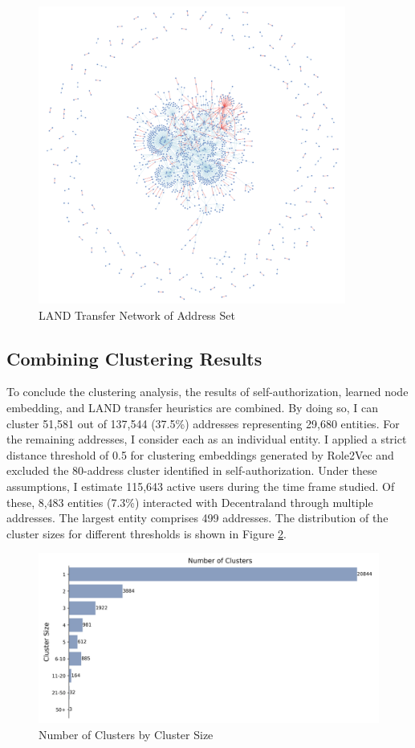\documentclass[12pt,a4paper,titlepage,oneside,english]{article}
\begin{document}
\begin{figure}[h!]
	\centering
	\includegraphics[width=0.9\textwidth]{./figures/land_network.png}
	\caption{LAND Transfer Network of Address Set}
	\label{fig:LAND_network}
\end{figure} 

\subsection{Combining Clustering Results}
To conclude the clustering analysis, the results of self-authorization, learned node embedding, and LAND transfer heuristics are combined. By doing so, I can cluster 51,581 out of 137,544 (37.5\%) addresses representing 29,680 entities. 
For the remaining addresses, I consider each as an individual entity. 
I applied a strict distance threshold of 0.5 for clustering embeddings generated by Role2Vec and excluded the 80-address cluster identified in self-authorization.
Under these assumptions, I estimate 115,643 active users during the time frame studied. Of these, 8,483 entities (7.3\%) interacted with Decentraland through multiple addresses. The largest entity comprises 499 addresses. The distribution of the cluster sizes for different thresholds is shown in Figure \ref{fig:barplot_clusters}.

\begin{figure}[h]
	\centering
	\includegraphics[width=\textwidth]{./figures/cluster-size-distribution.png}
	\caption{Number of Clusters by Cluster Size}
	\label{fig:barplot_clusters}
\end{figure}
\end{document}
